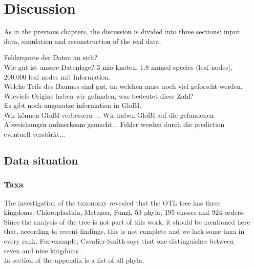 \chapter{Discussion}
  As in the previous chapters, the discussion is divided into three sections: input data, simulation 
    and reconstruction of the real data.

  Fehlerqoute der Daten an sich? \\
  Wie gut ist unsere Datenlage? 3 mio knoten, 1.8 named species (leaf nodes), 200.000 leaf nodes mit 
  Information. \\
  Welche Teile des Baumes sind gut, an welchen muss noch viel geforscht werden. \\
  Wieviele Origins haben wir gefunden, was bedeutet diese Zahl? \\
  Es gibt noch ungenutze information in GloBI. \\
  Wir können GloBI verbessern ... Wir haben GloBI auf die gefundenen Abweichungen aufmerksam gemacht... 
    Fehler werden durch die prediction eventuell verstärkt...\\

  \section{Data situation}

    \subsection{Taxa}
      The investigation of the taxonomy revealed that the OTL tree has three kingdoms: Chloroplastida, 
        Metazoa, Fungi, 53 phyla, 195 classes and 924 orders. \\
      Since the analysis of the tree is not part of this work, it should be mentioned here that, 
        according to recent findings, this is not complete and we lack some taxa in every rank. For 
        example, Cavalier-Smith says that one distinguishes between seven and nine kingdoms 
        \cite{CavalierSmith1981}. \\
      In section \pageref{subsec:listPhyla} of the appendix is a list of all phyla.

